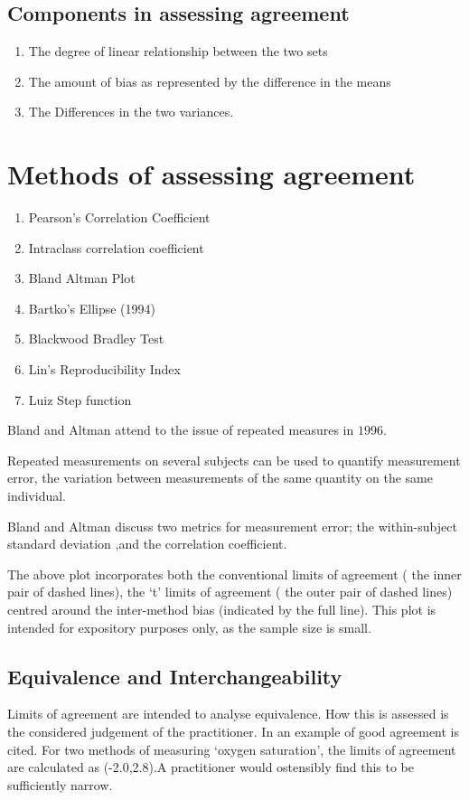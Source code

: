 \documentclass[12pt, a4paper]{report}
\theoremstyle{plain}
\theoremstyle{definition}
\theoremstyle{remark}
\begin{document}
\subsection*{Components in assessing agreement}

\begin{enumerate}
	\item The degree of linear relationship between the two sets \item
	The amount of bias as represented by the difference in the
	means\item The Differences in the two variances.
\end{enumerate}

\section{Methods of assessing agreement}

\begin{enumerate}
	\item Pearson's Correlation Coefficient\item Intraclass
	correlation coefficient \item Bland Altman Plot \item Bartko's
	Ellipse (1994) \item Blackwood Bradley Test \item Lin's
	Reproducibility Index \item Luiz Step function
\end{enumerate}

Bland and Altman attend to the issue of repeated measures in
$1996$.

Repeated measurements on several subjects can be used to quantify
measurement error, the variation between measurements of the same
quantity on the same individual.

Bland and Altman discuss two metrics for measurement error; the
within-subject standard deviation ,and the correlation
coefficient.

The above plot incorporates both the conventional limits of
agreement ( the inner pair of dashed lines), the `t' limits of
agreement ( the outer pair of dashed lines) centred around the
inter-method bias (indicated by the full line). This plot is
intended for expository purposes only, as the sample size is
small.





\subsection{Equivalence and Interchangeability}
Limits of agreement are intended to analyse equivalence. How this
is assessed is the considered judgement of the practitioner. In
\citet{BA86} an example of good agreement is cited. For two
methods of measuring `oxygen saturation', the limits of agreement
are calculated as (-2.0,2.8).A practitioner would ostensibly find
this to be sufficiently narrow.
\end{document}
